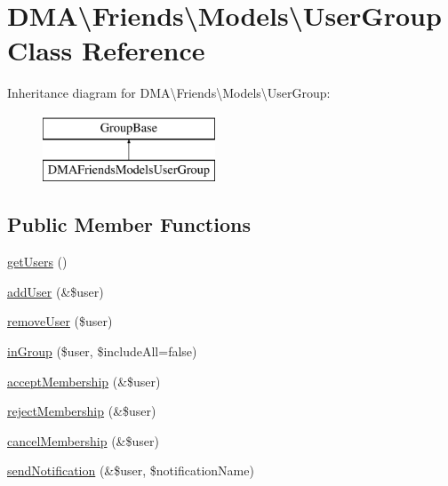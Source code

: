 \hypertarget{classDMA_1_1Friends_1_1Models_1_1UserGroup}{\section{D\-M\-A\textbackslash{}Friends\textbackslash{}Models\textbackslash{}User\-Group Class Reference}
\label{classDMA_1_1Friends_1_1Models_1_1UserGroup}
}
Inheritance diagram for D\-M\-A\textbackslash{}Friends\textbackslash{}Models\textbackslash{}User\-Group\-:\begin{figure}[H]
\begin{center}
\leavevmode
\includegraphics[height=2.000000cm]{d2/daf/classDMA_1_1Friends_1_1Models_1_1UserGroup}
\end{center}
\end{figure}
\subsection*{Public Member Functions}
\begin{DoxyCompactItemize}
\item 
\hyperlink{classDMA_1_1Friends_1_1Models_1_1UserGroup_a7f998f837a0bd734e0f1496f6902793f}{get\-Users} ()
\item 
\hyperlink{classDMA_1_1Friends_1_1Models_1_1UserGroup_a13eaffc2b414fe5dfd42aa6ac5fe75ca}{add\-User} (\&\$user)
\item 
\hyperlink{classDMA_1_1Friends_1_1Models_1_1UserGroup_ac08ee6038b5f0314c341123025484b91}{remove\-User} (\$user)
\item 
\hyperlink{classDMA_1_1Friends_1_1Models_1_1UserGroup_aab0755a408dcbff4a64277cd9032b9bf}{in\-Group} (\$user, \$include\-All=false)
\item 
\hyperlink{classDMA_1_1Friends_1_1Models_1_1UserGroup_ac55e9a0b178ed308374720c3dd9d7f90}{accept\-Membership} (\&\$user)
\item 
\hyperlink{classDMA_1_1Friends_1_1Models_1_1UserGroup_a09e0cf14a97b5618bd5db36dc320bf7e}{reject\-Membership} (\&\$user)
\item 
\hyperlink{classDMA_1_1Friends_1_1Models_1_1UserGroup_a0e21f8d83c3a53b9119fff9395da55a4}{cancel\-Membership} (\&\$user)
\item 
\hyperlink{classDMA_1_1Friends_1_1Models_1_1UserGroup_ac81ce5f041517ca368383038a9443034}{send\-Notification} (\&\$user, \$notification\-Name)
\end{DoxyCompactItemize}
